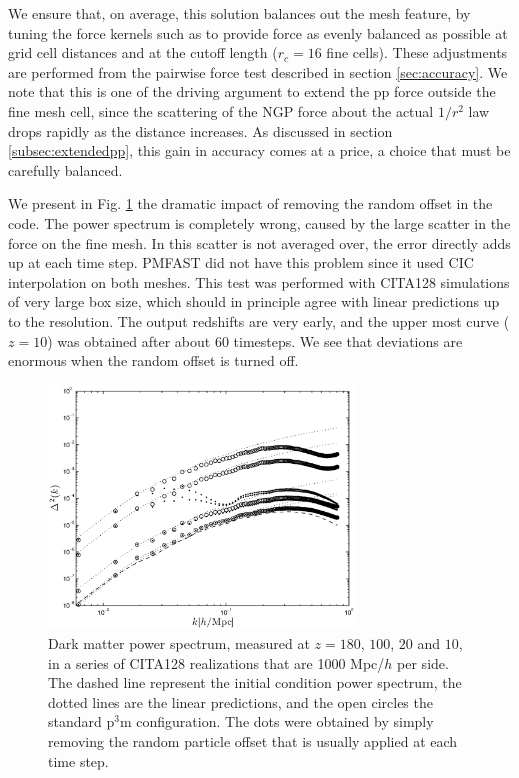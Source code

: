 We ensure that, on average, this solution balances out the mesh feature,
by tuning the force kernels such as to provide  force as evenly balanced as possible at grid cell distances
and at the cutoff length ($r_{c}=16$ fine cells).
These adjustments are performed from the pairwise force test described in section \ref{sec:accuracy}.
We note that this is one of the driving argument to extend the pp force outside the fine mesh cell,
since the scattering of the NGP force about the actual $1/r^{2}$ law drops rapidly as the distance increases.
As discussed in section \ref{subsec:extendedpp}, this gain in accuracy comes at a price,
a choice that  must be carefully balanced.

We present in Fig. \ref{fig:disp_mesh} the dramatic impact of removing the random offset in the code.
The power spectrum is completely wrong, caused by the large scatter in the force on the fine mesh.
In this scatter is not averaged over, the error directly adds up at each time step. {\small PMFAST}
did not have this problem since it used CIC interpolation on both meshes.  
This test was performed with CITA128 simulations of very large box size,
which should in principle agree with linear predictions up to the resolution.
The output redshifts are very early, and the upper most curve ($z=10$) was obtained after
about 60 timesteps.
We see that deviations are enormous when the random offset is turned off.

\begin{figure}%
  \begin{center}
    \includegraphics[width=3.2in]{graphs/power_w_wo_disp_mesh.eps}
  \caption{Dark matter power spectrum, measured at $z=180$, $100$, $20$ and $10$, in a series of CITA128 realizations that are 1000 Mpc/$h$ per side. The dashed line represent the initial condition power spectrum, the dotted lines are the linear predictions, and  the open circles the standard p$^3$m configuration. 
  The dots were obtained by simply removing the random particle offset that is usually applied at each time step. \label{fig:disp_mesh}}
\end{center}
\end{figure}


